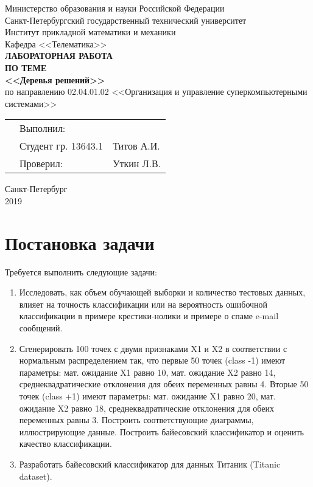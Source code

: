 \documentclass[]{article}
\numberwithin{equation}{section}
\begin{document}
    \thispagestyle{empty}
	\begin{center}
        Министерство образования и науки Российской Федерации\\
		Санкт-Петербургский государственный технический университет\\
		Институт прикладной математики и механики\\
		Кафедра <<Телематика>>\\
		\vspace{5cm}
		\textbf{\textbf{ЛАБОРАТОРНАЯ РАБОТА}}\\
        \vspace{0.5cm}
        \textbf{ПО ТЕМЕ}\\
        \vspace{0.5cm}
		\textbf{\textbf{<<Деревья решений>>}}\\
		\vspace{3cm}
		по направлению 02.04.01.02 <<Организация и управление суперкомпьютерными системами>>
	\end{center}
	\vspace{2cm}
	\begin{tabular} {l l l}
	\hspace{9.5cm} & Выполнил: & \\
	& Студент гр. 13643.1 & Титов А.И.\\
	& Проверил: & Уткин Л.В.
	\end{tabular}
	\vspace{4.5cm}
	\begin{center}
		Санкт-Петербург\\
		2019
    \end{center}


	\renewcommand\contentsname{Оглавление}
	\tableofcontents

    \newpage
    \section*{Постановка задачи}

    Требуется выполнить следующие задачи:
    \begin{enumerate}
        \item Исследовать, как объем обучающей выборки и количество тестовых данных, влияет на точность классификации или на вероятность ошибочной классификации в примере крестики-нолики и примере о спаме e-mail сообщений.
        \item Сгенерировать 100 точек с двумя признаками X1 и X2 в соответствии с нормальным распределением так, что первые 50 точек (class -1) имеют параметры: мат. ожидание X1  равно 10, мат. ожидание X2 равно 14, среднеквадратические отклонения для обеих переменных равны 4. Вторые 50 точек (class +1) имеют параметры: мат. ожидание X1 равно 20, мат. ожидание X2 равно 18, среднеквадратические отклонения для обеих переменных равны 3. Построить соответствующие диаграммы, иллюстрирующие данные. Построить байесовский классификатор и оценить качество классификации.
        \item Разработать байесовский классификатор для данных Титаник (Titanic dataset).
    \end{enumerate}
\end{document}
